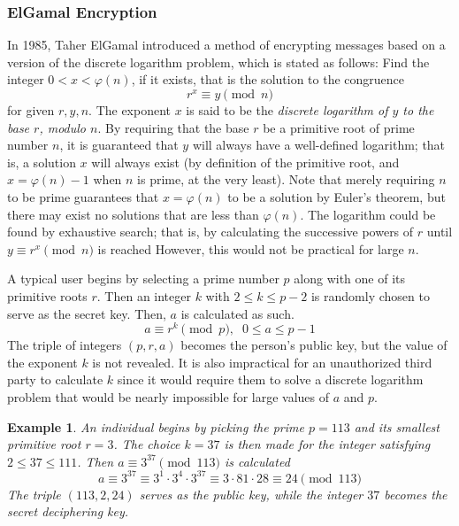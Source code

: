 \documentclass{article}
\newtheorem{example}{Example}[section]
\theoremstyle{remark}
\theoremstyle{definition}
\begin{document}
\subsubsection{ElGamal Encryption}
In 1985, Taher ElGamal introduced a method of encrypting messages based on a version of the discrete logarithm problem, which is stated as follows: Find the integer $0 < x < \varphi(n)$, if it exists, that is the solution to the congruence
\[r^x \equiv y \pmod{n}\]
for given $r, y, n$. The exponent $x$ is said to be the \textit{discrete logarithm of $y$ to the base $r$, modulo $n$}. By requiring that the base $r$ be a primitive root of prime number $n$, it is guaranteed that $y$ will always have a well-defined logarithm; that is, a solution $x$ will always exist (by definition of the primitive root, and $x = \varphi(n) - 1$ when $n$ is prime, at the very least). Note that merely requiring $n$ to be prime guarantees that $x = \varphi(n)$ to be a solution by Euler's theorem, but there may exist no solutions that are less than $\varphi(n)$. The logarithm could be found by exhaustive search; that is, by calculating the successive powers of $r$ until $y \equiv r^x \pmod{n}$ is reached However, this would not be practical for large $n$. 

A typical user begins by selecting a prime number $p$ along with one of its primitive roots $r$. Then an integer $k$ with $2 \leq k \leq p-2$ is randomly chosen to serve as the secret key. Then, $a$ is calculated as such. 
\[a \equiv r^k \pmod{p}, \;\; 0 \leq a \leq p-1\]
The triple of integers $(p, r, a)$ becomes the person's public key, but the value of the exponent $k$ is not revealed. It is also impractical for an unauthorized third party to calculate $k$ since it would require them to solve a discrete logarithm problem that would be nearly impossible for large values of $a$ and $p$. 

\begin{example}
An individual begins by picking the prime $p = 113$ and its smallest primitive root $r=3$. The choice $k=37$ is then made for the integer satisfying $2 \leq 37 \leq 111$. Then $a \equiv 3^{37} \pmod{113}$ is calculated 
\[a \equiv 3^{37} \equiv 3^1 \cdot 3^4 \cdot 3^{37} \equiv 3 \cdot 81 \cdot 28 \equiv 24 \pmod{113}\]
The triple $(113, 2, 24)$ serves as the public key, while the integer $37$ becomes the secret deciphering key. 
\end{example}
\end{document}
